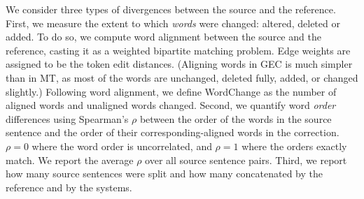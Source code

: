 \documentclass[11pt, a4paper]{article}
\begin{document}
We consider three types of divergences between the source and the reference.
First, we measure the extent to which \emph{words} were changed: altered, deleted or added.
To do so, we compute word alignment between the source and the reference, casting it
as a weighted bipartite matching problem. Edge weights are assigned to be the token edit distances.
(Aligning words in GEC is much simpler than in MT,
as most of the words are unchanged, deleted fully, added, or changed slightly.)
Following word alignment, we define {\sc WordChange}
as the number of aligned words and unaligned words changed.
Second, we quantify word \emph{order} differences using
Spearman's $\rho$ between the order of the words in the source sentence
and the order of their corresponding-aligned words in the correction.
$\rho=0$ where the word order is uncorrelated, and $\rho=1$ where the orders exactly match. We report the average $\rho$ over all source sentence pairs. 
Third, we report how many source sentences were split and how many concatenated by the reference and by the systems.
\end{document}
